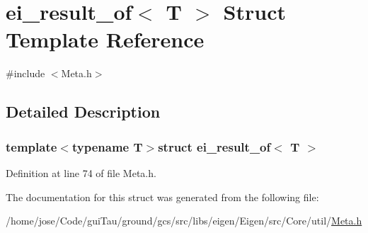 \hypertarget{structei__result__of}{\section{ei\-\_\-result\-\_\-of$<$ T $>$ Struct Template Reference}
\label{structei__result__of}
}


{\ttfamily \#include $<$Meta.\-h$>$}



\subsection{Detailed Description}
\subsubsection*{template$<$typename T$>$struct ei\-\_\-result\-\_\-of$<$ T $>$}



Definition at line 74 of file Meta.\-h.



The documentation for this struct was generated from the following file\-:\begin{DoxyCompactItemize}
\item 
/home/jose/\-Code/gui\-Tau/ground/gcs/src/libs/eigen/\-Eigen/src/\-Core/util/\hyperlink{_meta_8h}{Meta.\-h}\end{DoxyCompactItemize}
